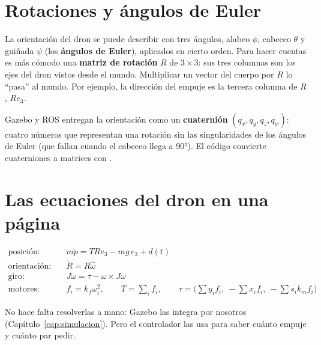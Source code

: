 \section{Rotaciones y ángulos de Euler}

La orientación del dron se puede describir con tres ángulos, alabeo $\phi$, cabeceo $\theta$ y
guiñada $\psi$ (los \textbf{ángulos de Euler}), aplicados en cierto orden. Para hacer cuentas es más
cómodo una \textbf{matriz de rotación} $R$ de $3\times3$: sus tres columnas son los ejes del dron
vistos desde el mundo. Multiplicar un vector del cuerpo por $R$ lo ``pasa'' al mundo. Por ejemplo,
la dirección del empuje es la tercera columna de $R$, $R e_3$.

\begin{tecnico}
Gazebo y ROS entregan la orientación como un \textbf{cuaternión} $(q_x, q_y, q_z, q_w)$: cuatro
números que representan una rotación sin las singularidades de los ángulos de Euler (que fallan
cuando el cabeceo llega a 90°). El código convierte cuaterniones a matrices con
.
\end{tecnico}

\section{Las ecuaciones del dron en una página}

\begin{tcolorbox}[colback=white,colframe=NavyBlue!60!black,title=Modelo del cuadrirrotor]
\begin{align*}
\text{posición:}\quad & m\ddot p = T R e_3 - mg\,e_3 + d(t)\\
\text{orientación:}\quad & \dot R = R\hat\omega\\
\text{giro:}\quad & J\dot\omega = \tau - \omega\times J\omega\\
\text{motores:}\quad & f_i = k_f\omega_i^2,\qquad T = \textstyle\sum_i f_i,\qquad
\tau = \big(\textstyle\sum y_i f_i,\ -\sum x_i f_i,\ -\sum s_i k_m f_i\big)
\end{align*}
\end{tcolorbox}

No hace falta resolverlas a mano: Gazebo las integra por nosotros (Capítulo~\ref{cap:simulacion}).
Pero el controlador las usa para saber cuánto empuje y cuánto par pedir.
